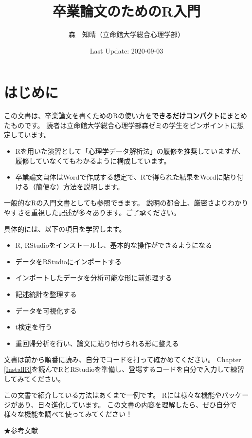 \documentclass[]{book}
\title{卒業論文のためのR入門}
\author{森　知晴（立命館大学総合心理学部）}
\date{Last Update: 2020-09-03}
\providecommand{\tightlist}{%
  \setlength{\itemsep}{0pt}\setlength{\parskip}{0pt}}
\begin{document}
\maketitle

{
\setcounter{tocdepth}{1}
\tableofcontents
}
\chapter{はじめに}\label{Introduction}

この文書は、卒業論文を書くためのRの使い方を\textbf{できるだけコンパクトに}まとめたものです。
読者は立命館大学総合心理学部森ゼミの学生をピンポイントに想定しています。

\begin{itemize}
\tightlist
\item
  Rを用いた演習として「心理学データ解析法」の履修を推奨していますが、履修していなくてもわかるように構成しています。
\item
  卒業論文自体はWordで作成する想定で、Rで得られた結果をWordに貼り付ける（簡便な）方法を説明します。
\end{itemize}

一般的なRの入門文書としても参照できます。
説明の都合上、厳密さよりわかりやすさを重視した記述が多々あります。ご了承ください。

具体的には、以下の項目を学習します。

\begin{itemize}
\tightlist
\item
  R, RStudioをインストールし、基本的な操作ができるようになる
\item
  データをRStudioにインポートする
\item
  インポートしたデータを分析可能な形に前処理する
\item
  記述統計を整理する
\item
  データを可視化する
\item
  t検定を行う
\item
  重回帰分析を行い、論文に貼り付けられる形に整える
\end{itemize}

文書は前から順番に読み、自分でコードを打って確かめてください。 Chapter
\ref{InstallR}を読んでRとRStudioを準備し、登場するコードを自分で入力して練習してみてください。

この文書で紹介している方法はあくまで一例です。
Rには様々な機能やパッケージがあり、日々進化しています。
この文書の内容を理解したら、ぜひ自分で様々な機能を調べて使ってみてください！

★参考文献
\end{document}

